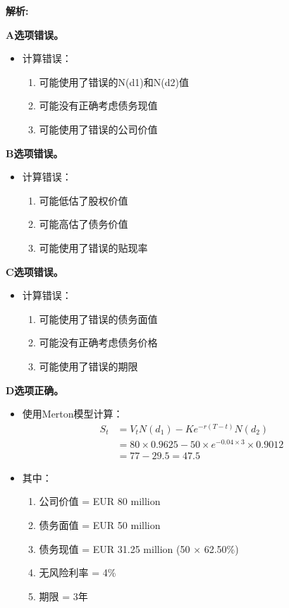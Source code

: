 \documentclass{article}
\newenvironment{explanation}
{\textbf{解析:}\par}
{\par}
\begin{document}
\begin{explanation}
    \textbf{A选项错误。}
    \begin{itemize}
        \item 计算错误：
        \begin{enumerate}
            \item 可能使用了错误的N(d1)和N(d2)值
            \item 可能没有正确考虑债务现值
            \item 可能使用了错误的公司价值
        \end{enumerate}
    \end{itemize}
    
    \textbf{B选项错误。}
    \begin{itemize}
        \item 计算错误：
        \begin{enumerate}
            \item 可能低估了股权价值
            \item 可能高估了债务价值
            \item 可能使用了错误的贴现率
        \end{enumerate}
    \end{itemize}
    
    \textbf{C选项错误。}
    \begin{itemize}
        \item 计算错误：
        \begin{enumerate}
            \item 可能使用了错误的债务面值
            \item 可能没有正确考虑债务价格
            \item 可能使用了错误的期限
        \end{enumerate}
    \end{itemize}
    
    \textbf{D选项正确。}
    \begin{itemize}
        \item 使用Merton模型计算：
        \[
        \begin{aligned}
        S_t &= V_tN(d_1) - Ke^{-r(T-t)}N(d_2) \\
        &= 80 \times 0.9625 - 50 \times e^{-0.04 \times 3} \times 0.9012 \\
        &= 77 - 29.5 = 47.5
        \end{aligned}
        \]
        \item 其中：
        \begin{enumerate}
            \item 公司价值 = EUR 80 million
            \item 债务面值 = EUR 50 million
            \item 债务现值 = EUR 31.25 million (50 × 62.50\%)
            \item 无风险利率 = 4\%
            \item 期限 = 3年
        \end{enumerate}
    \end{itemize}
\end{explanation}
\end{document}
